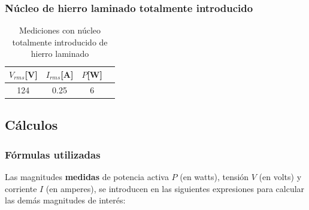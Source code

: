 \documentclass{article}
\begin{document}
            \subsubsection{Núcleo de hierro laminado totalmente introducido}

            \begin{table}[H]
                \centering
                \begin{tabular}{|c|c|c|c|}
                    \hline
                    $V_{rms} $[V] & $I_{rms} $[A] & $P $[W] \\ \hline
                    124           & 0.25         & 6    \\ \hline
                \end{tabular}
                \caption{Mediciones con núcleo totalmente introducido de hierro laminado}
                \label{tab:mediciones-nucleo-totalmente-introducido-hierro-laminado}
            \end{table}

        \subsection{Cálculos} \label{sec:Cálculos}

            \subsubsection*{Fórmulas utilizadas}

            Las magnitudes \textbf{medidas} de potencia activa $P$ (en watts), 
            tensión $V$ (en volts) y corriente $I$ (en amperes), se introducen en las siguientes
            expresiones para calcular las demás magnitudes de interés:
\end{document}
